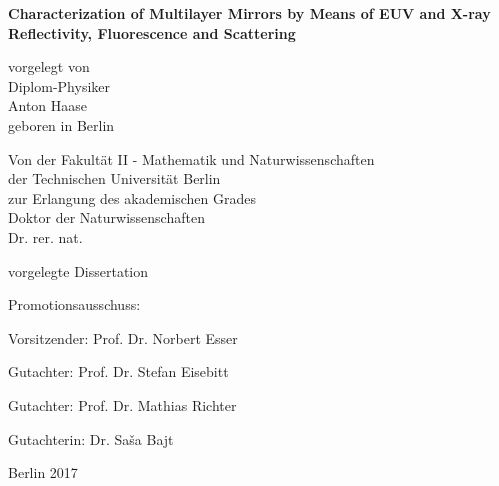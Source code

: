 
\begin{titlepage}
{\noindent\sffamily\large%
    \begin{center}
        \vspace*{3ex}
        {\LARGE\bfseries\sffamily
           Characterization of Multilayer Mirrors by Means of EUV and X-ray Reflectivity, Fluorescence and Scattering
        }
        \vspace{1cm}

        vorgelegt von \\
        Diplom-Physiker \\
        Anton Haase \\
        geboren in Berlin \\
        \vspace{4cm}

        Von der Fakultät II - Mathematik und Naturwissenschaften \\
        der Technischen Universität Berlin \\
        zur Erlangung des akademischen Grades \\
        Doktor der Naturwissenschaften \\
        Dr. rer. nat. \\
        \vspace{3ex}

        vorgelegte Dissertation \\
        \vspace{2cm}
    \end{center}

    Promotionsausschuss:
    \vspace{2ex}

    Vorsitzender: Prof. Dr. Norbert Esser

    Gutachter: Prof. Dr. Stefan Eisebitt

    Gutachter: Prof. Dr. Mathias Richter

    Gutachterin: Dr. Sa\v{s}a Bajt
    \vspace{1ex}


    \begin{center}
        Berlin 2017
    \end{center}
}
\end{titlepage}

\cleardoublepage


